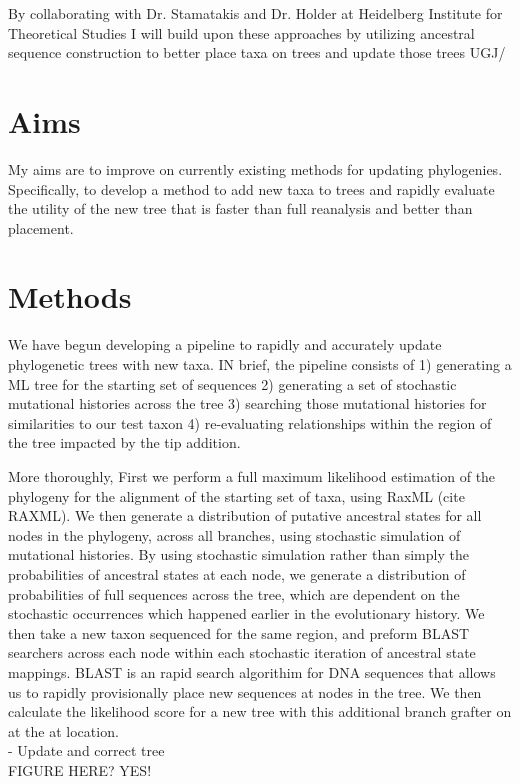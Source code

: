 \documentclass[10pt]{article}
\begin{document}
By collaborating with Dr. Stamatakis and Dr. Holder at Heidelberg Institute for Theoretical Studies I will build upon these approaches by utilizing ancestral sequence construction to better place taxa on trees and update those trees UGJ/


\section*{Aims}
 My aims are to improve on currently existing methods for updating phylogenies. Specifically, to develop a method to add new taxa to trees and rapidly evaluate the utility of the new tree that is faster than full reanalysis and better than placement.
 
\section*{Methods}

We have begun developing a pipeline to rapidly and accurately update phylogenetic trees with new taxa. IN brief, the pipeline consists of 1) generating a ML tree for the starting set of sequences 2) generating a set of stochastic mutational histories across the tree 3) searching those mutational histories for similarities to our test taxon 4) re-evaluating relationships within the region of the tree impacted by the tip addition.

More thoroughly,
First we perform a full maximum likelihood estimation of the phylogeny for the alignment of the starting set of taxa, using RaxML (cite RAXML). We then generate a distribution of putative ancestral states for all nodes in the phylogeny, across all branches, using stochastic simulation of mutational histories. By using stochastic simulation rather than simply the probabilities of ancestral states at each node, we generate a distribution of probabilities of full sequences across the tree, which are dependent on the stochastic occurrences which happened earlier in the evolutionary history. We then take a new taxon sequenced for the same region, and preform BLAST searchers across each node within each stochastic iteration of ancestral state mappings. BLAST is an rapid search algorithim for DNA sequences that allows us to rapidly provisionally place new sequences at nodes in the tree. We then calculate the likelihood score for a new tree with this additional branch grafter on at the at location. 
\\     - Update and correct tree
\\     FIGURE HERE? YES!
\end{document}
